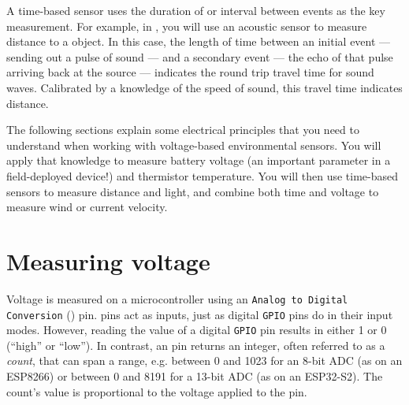 A time-based sensor uses the duration of or interval between events as the key measurement.
For example, in , you will use an acoustic sensor to measure distance to a object.
In this case, the length of time between an initial event --- sending out a pulse of sound --- and a secondary event --- the echo of that pulse arriving back at the source --- indicates the round trip travel time for sound waves.
Calibrated by a knowledge of the speed of sound, this travel time indicates distance.

The following sections explain some electrical principles that you need to understand when working with voltage-based environmental sensors. You will apply that knowledge to measure battery voltage (an important parameter in a field-deployed device!) and thermistor temperature. You will then use time-based sensors to measure distance and light, and combine both time and voltage to measure wind or current velocity.

%
%
%

\section{Measuring voltage}
Voltage is measured on a microcontroller using an \texttt{Analog to Digital Conversion} (\adc) pin.
\adc pins act as inputs, just as digital \texttt{GPIO} pins do in their input modes.
However, reading the value of a digital \texttt{GPIO} pin results in either 1 or 0 (``high'' or ``low'').
In contrast, an \adc pin returns an integer, often referred to as a \emph{count}, that can span a range, e.g. between 0 and 1023 for an 8-bit ADC (as on an ESP8266) or between 0 and 8191 for a 13-bit ADC (as on an ESP32-S2).
The count's value is proportional to the voltage applied to the \adc pin.

